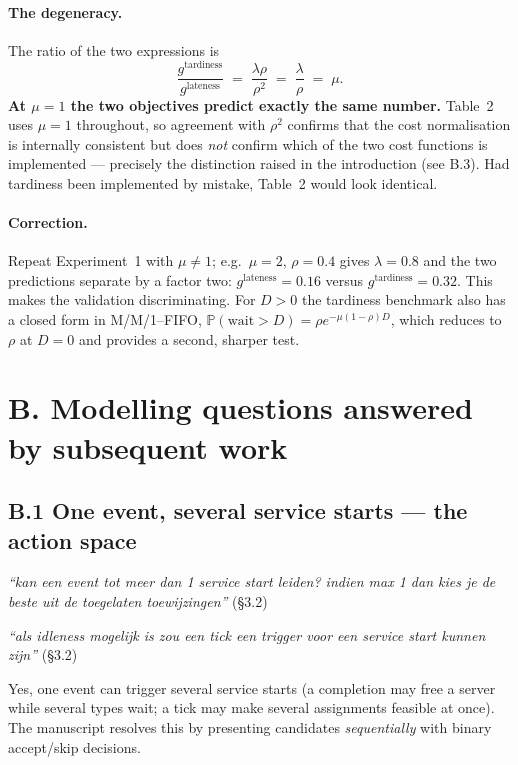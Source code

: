\documentclass[11pt,a4paper]{article}
\newcommand{\Prob}{\mathbb{P}}
\newcommand{\comment}[1]{\textcolor{red!70!black}{\textit{``#1''}}}
\begin{document}
\paragraph{The degeneracy.}
The ratio of the two expressions is
\[
  \frac{g^{\text{tardiness}}}{g^{\text{lateness}}}
  \;=\; \frac{\lambda\rho}{\rho^2} \;=\; \frac{\lambda}{\rho} \;=\; \mu .
\]
\textbf{At $\mu = 1$ the two objectives predict exactly the same number.}
Table~2 uses $\mu = 1$ throughout, so agreement with $\rho^2$ confirms that the
cost normalisation is internally consistent but does \emph{not} confirm which
of the two cost functions is implemented --- precisely the distinction raised in
the introduction (see B.3).  Had tardiness been implemented by mistake,
Table~2 would look identical.

\paragraph{Correction.}
Repeat Experiment~1 with $\mu \neq 1$; e.g.\ $\mu = 2$, $\rho = 0.4$ gives
$\lambda = 0.8$ and the two predictions separate by a factor two:
$g^{\text{lateness}} = 0.16$ versus $g^{\text{tardiness}} = 0.32$.  This makes
the validation discriminating.  For $D > 0$ the tardiness benchmark also has a
closed form in M/M/1--FIFO, $\Prob(\text{wait} > D) = \rho e^{-\mu(1-\rho)D}$,
which reduces to $\rho$ at $D=0$ and provides a second, sharper test.

\section*{B. Modelling questions answered by subsequent work}

\subsection*{B.1 One event, several service starts --- the action space}

\comment{kan een event tot meer dan 1 service start leiden? indien max 1 dan
kies je de beste uit de toegelaten toewijzingen} \hfill (\S3.2)

\comment{als idleness mogelijk is zou een tick een trigger voor een service
start kunnen zijn} \hfill (\S3.2)

Yes, one event can trigger several service starts (a completion may free a
server while several types wait; a tick may make several assignments feasible
at once).  The manuscript resolves this by presenting candidates
\emph{sequentially} with binary accept/skip decisions.
\end{document}

